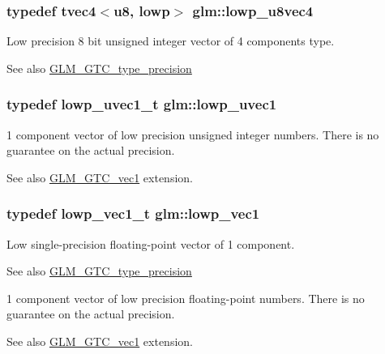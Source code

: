 \subsubsection[{lowp\+\_\+u8vec4}]{\setlength{\rightskip}{0pt plus 5cm}typedef tvec4$<${\bf u8}, lowp$>$ {\bf glm\+::lowp\+\_\+u8vec4}}\label{namespaceglm_a92e38081e667dd04e6a95817e9c4885e}
Low precision 8 bit unsigned integer vector of 4 components type. \begin{DoxySeeAlso}{See also}
\hyperlink{group__gtc__type__precision}{G\+L\+M\+\_\+\+G\+T\+C\+\_\+type\+\_\+precision} 
\end{DoxySeeAlso}
\hypertarget{namespaceglm_ad50d8a6d477675ffc627f0949f1d5615}{}
\subsubsection[{lowp\+\_\+uvec1}]{\setlength{\rightskip}{0pt plus 5cm}typedef lowp\+\_\+uvec1\+\_\+t {\bf glm\+::lowp\+\_\+uvec1}}\label{namespaceglm_ad50d8a6d477675ffc627f0949f1d5615}
1 component vector of low precision unsigned integer numbers. There is no guarantee on the actual precision. \begin{DoxySeeAlso}{See also}
\hyperlink{group__gtc__vec1}{G\+L\+M\+\_\+\+G\+T\+C\+\_\+vec1} extension. 
\end{DoxySeeAlso}
\hypertarget{namespaceglm_ae48c64f920be353ece773ff367f0161c}{}
\subsubsection[{lowp\+\_\+vec1}]{\setlength{\rightskip}{0pt plus 5cm}typedef lowp\+\_\+vec1\+\_\+t {\bf glm\+::lowp\+\_\+vec1}}\label{namespaceglm_ae48c64f920be353ece773ff367f0161c}
Low single-\/precision floating-\/point vector of 1 component. \begin{DoxySeeAlso}{See also}
\hyperlink{group__gtc__type__precision}{G\+L\+M\+\_\+\+G\+T\+C\+\_\+type\+\_\+precision}
\end{DoxySeeAlso}
1 component vector of low precision floating-\/point numbers. There is no guarantee on the actual precision. \begin{DoxySeeAlso}{See also}
\hyperlink{group__gtc__vec1}{G\+L\+M\+\_\+\+G\+T\+C\+\_\+vec1} extension. 
\end{DoxySeeAlso}
\hypertarget{namespaceglm_aaa6feab0c0e87cd19c19afc24c807720}{}
